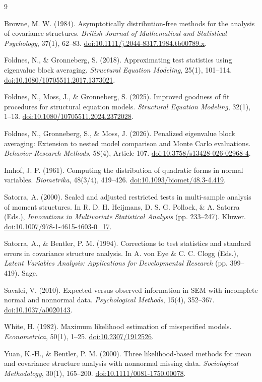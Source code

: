 \documentclass[11pt]{article}
\begin{document}
\begin{thebibliography}{9}

Browne, M. W. (1984).
Asymptotically distribution-free methods for the analysis of covariance
structures.
\emph{British Journal of Mathematical and Statistical Psychology}, 37(1),
62--83.
\href{https://doi.org/10.1111/j.2044-8317.1984.tb00789.x}{doi:10.1111/j.2044-8317.1984.tb00789.x}.

Foldnes, N., \& Gronneberg, S. (2018).
Approximating test statistics using eigenvalue block averaging.
\emph{Structural Equation Modeling}, 25(1), 101--114.
\href{https://doi.org/10.1080/10705511.2017.1373021}{doi:10.1080/10705511.2017.1373021}.

Foldnes, N., Moss, J., \& Gronneberg, S. (2025).
Improved goodness of fit procedures for structural equation models.
\emph{Structural Equation Modeling}, 32(1), 1--13.
\href{https://doi.org/10.1080/10705511.2024.2372028}{doi:10.1080/10705511.2024.2372028}.

Foldnes, N., Gronneberg, S., \& Moss, J. (2026).
Penalized eigenvalue block averaging: Extension to nested model comparison and
Monte Carlo evaluations.
\emph{Behavior Research Methods}, 58(4), Article 107.
\href{https://doi.org/10.3758/s13428-026-02968-4}{doi:10.3758/s13428-026-02968-4}.

Imhof, J. P. (1961).
Computing the distribution of quadratic forms in normal variables.
\emph{Biometrika}, 48(3/4), 419--426.
\href{https://doi.org/10.1093/biomet/48.3-4.419}{doi:10.1093/biomet/48.3-4.419}.

Satorra, A. (2000).
Scaled and adjusted restricted tests in multi-sample analysis of moment
structures.
In R. D. H. Heijmans, D. S. G. Pollock, \& A. Satorra (Eds.),
\emph{Innovations in Multivariate Statistical Analysis} (pp. 233--247).
Kluwer.
\href{https://doi.org/10.1007/978-1-4615-4603-0_17}{doi:10.1007/978-1-4615-4603-0\_17}.

Satorra, A., \& Bentler, P. M. (1994).
Corrections to test statistics and standard errors in covariance structure
analysis.
In A. von Eye \& C. C. Clogg (Eds.),
\emph{Latent Variables Analysis: Applications for Developmental Research}
(pp. 399--419). Sage.

Savalei, V. (2010).
Expected versus observed information in SEM with incomplete normal and
nonnormal data.
\emph{Psychological Methods}, 15(4), 352--367.
\href{https://doi.org/10.1037/a0020143}{doi:10.1037/a0020143}.

White, H. (1982).
Maximum likelihood estimation of misspecified models.
\emph{Econometrica}, 50(1), 1--25.
\href{https://doi.org/10.2307/1912526}{doi:10.2307/1912526}.

Yuan, K.-H., \& Bentler, P. M. (2000).
Three likelihood-based methods for mean and covariance structure analysis with
nonnormal missing data.
\emph{Sociological Methodology}, 30(1), 165--200.
\href{https://doi.org/10.1111/0081-1750.00078}{doi:10.1111/0081-1750.00078}.

\end{thebibliography}
\end{document}
